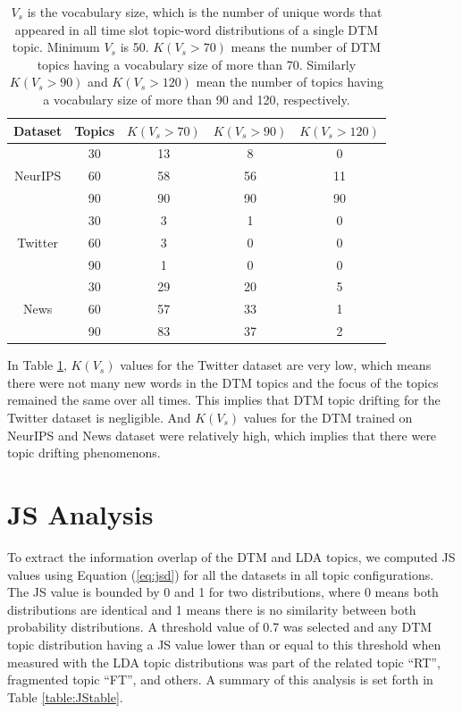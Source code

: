 \documentclass[a4paper]{report}
\begin{document}
\begin{table}[h!]
\begin{center}
\begin{tabular}{|c|c|c|c|c|}
\hline \textbf{Dataset} & \textbf{Topics} & $K(V_s > 70)$& $K(V_s > 90)$ & $K(V_s > 120)$ \\ \hline

\multirow{3}{*}{NeurIPS}  & 30 & 13 & 8 & 0 \\ & 60 & 58 & 56 & 11  \\ & 90 & 90 & 90 & 90  \\ \hline
\multirow{3}{*}{Twitter}  & 30 & 3 & 1 & 0 \\ & 60 & 3 & 0 & 0 \\ & 90 & 1 & 0 & 0 \\ \hline
\multirow{3}{*}{News}  & 30 & 29 & 20 & 5 \\ & 60 & 57 & 33 & 1 \\ & 90 & 83 & 37 & 2 \\ \hline

\end{tabular}
\caption{$V_s$ is the vocabulary size, which is the number of unique words that appeared in all time slot topic-word distributions of a single DTM topic. Minimum $V_s$ is 50.  $K(V_s > 70)$ means the number of DTM topics having a vocabulary size of more than 70. Similarly $K(V_s > 90)$ and $K(V_s > 120)$ mean the number of topics having a vocabulary size of more than 90 and 120, respectively. }
\label{table:topicDrifting}
\end{center}
\end{table}

In Table \ref{table:topicDrifting}, $K(V_s)$ values for the Twitter dataset are very low, which means there were not many new words in the DTM topics and the focus of the topics remained the same over all times. This implies that DTM topic drifting for the Twitter dataset is negligible. And $K(V_s)$ values for the DTM trained on NeurIPS and News dataset were relatively high, which implies that there were topic drifting phenomenons.

\section{JS Analysis}
To extract the information overlap of the DTM and LDA topics, we computed JS values using Equation (\ref{eq:jsd}) for all the datasets in all topic configurations. The JS value is bounded by 0 and 1 for two distributions, where 0 means both distributions are identical and 1 means there is no similarity between both probability distributions. A threshold value of 0.7 was selected and any DTM topic distribution having a JS value lower than or equal to this threshold when measured with the LDA topic distributions was part of the related topic ``RT'', fragmented topic ``FT'', and others. A summary of this analysis is set forth in Table \ref{table:JStable}.
\end{document}
